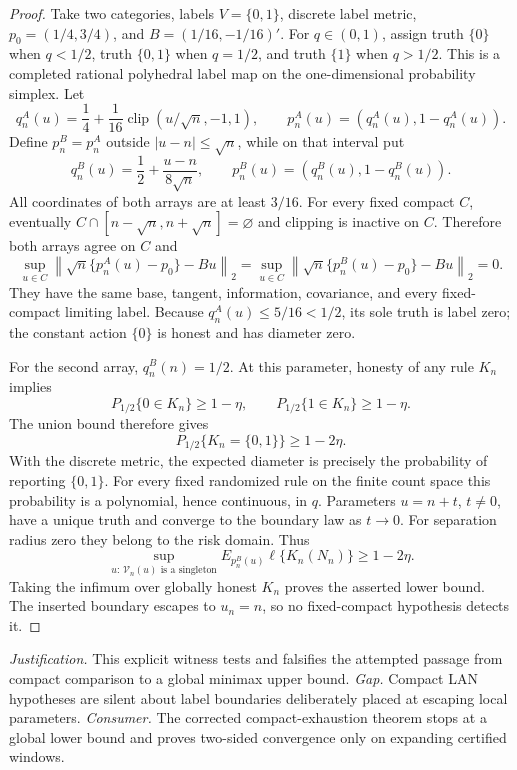 \documentclass{article}
\begin{document}
\begin{proof}
Take two categories, labels \(V=\{0,1\}\), discrete label metric, \(p_0=(1/4,3/4)\), and \(B=(1/16,-1/16)'\). For \(q\in(0,1)\), assign truth \(\{0\}\) when \(q<1/2\), truth \(\{0,1\}\) when \(q=1/2\), and truth \(\{1\}\) when \(q>1/2\). This is a completed rational polyhedral label map on the one-dimensional probability simplex. Let
\[
 q_n^A(u)=\frac14+\frac1{16}\operatorname{clip}(u/\sqrt n,-1,1),
 \qquad p_n^A(u)=(q_n^A(u),1-q_n^A(u)).
\]
Define \(p_n^B=p_n^A\) outside \(|u-n|\le\sqrt n\), while on that interval put
\[
 q_n^B(u)=\frac12+\frac{u-n}{8\sqrt n},
 \qquad p_n^B(u)=(q_n^B(u),1-q_n^B(u)).
\]
All coordinates of both arrays are at least \(3/16\). For every fixed compact \(C\), eventually \(C\cap[n-\sqrt n,n+\sqrt n]=\varnothing\) and clipping is inactive on \(C\). Therefore both arrays agree on \(C\) and
\[
 \sup_{u\in C}\left\|\sqrt n\{p_n^A(u)-p_0\}-Bu\right\|_2
 =\sup_{u\in C}\left\|\sqrt n\{p_n^B(u)-p_0\}-Bu\right\|_2=0.
\]
They have the same base, tangent, information, covariance, and every fixed-compact limiting label. Because \(q_n^A(u)\le5/16<1/2\), its sole truth is label zero; the constant action \(\{0\}\) is honest and has diameter zero.

For the second array, \(q_n^B(n)=1/2\). At this parameter, honesty of any rule \(K_n\) implies
\[
 P_{1/2}\{0\in K_n\}\ge1-\eta,
 \qquad P_{1/2}\{1\in K_n\}\ge1-\eta.
\]
The union bound therefore gives
\[
 P_{1/2}\{K_n=\{0,1\}\}
 \ge1-2\eta.
\]
With the discrete metric, the expected diameter is precisely the probability of reporting \(\{0,1\}\). For every fixed randomized rule on the finite count space this probability is a polynomial, hence continuous, in \(q\). Parameters \(u=n+t\), \(t\ne0\), have a unique truth and converge to the boundary law as \(t\to0\). For separation radius zero they belong to the risk domain. Thus
\[
 \sup_{u:\,\mathcal V_n(u)\text{ is a singleton}}
 E_{p_n^B(u)}\ell\{K_n(N_n)\}
 \ge1-2\eta.
\]
Taking the infimum over globally honest \(K_n\) proves the asserted lower bound. The inserted boundary escapes to \(u_n=n\), so no fixed-compact hypothesis detects it.
\end{proof}
\par\smallskip\noindent \textit{Justification.} This explicit witness tests and falsifies the attempted passage from compact comparison to a global minimax upper bound. \textit{Gap.} Compact LAN hypotheses are silent about label boundaries deliberately placed at escaping local parameters. \textit{Consumer.} The corrected compact-exhaustion theorem stops at a global lower bound and proves two-sided convergence only on expanding certified windows.
\end{document}

